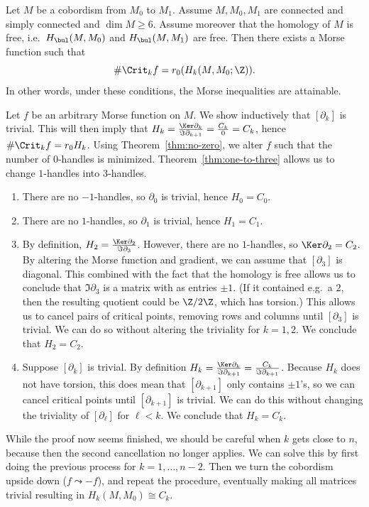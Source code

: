 \begin{theorem}[Smale]
    Let $M$ be a cobordism from $M_0$ to $M_1$.
    Assume $M, M_0, M_1$ are connected and simply connected and $\dim M \ge 6$.
    Assume moreover that the homology of $M$ is free, i.e.\ $H_{\bul}(M, M_0)$ and $H_{\bul}(M, M_1)$ are free.
    Then there exists a Morse function such that
    \[
        \# \Crit_k f = r_0(H_k(M, M_0; \Z))
    .\] 
    In other words, under these conditions, the Morse inequalities are attainable.
    \label{thm:minimal-cob}
\end{theorem}
\begin{myproof}
    Let $f$ be an arbitrary Morse function on $M$.
    We show inductively that $[\partial_k]$ is trivial.
    This will then imply that $H_k = \frac{\Ker \partial_k}{\Im \partial_{k+1}} = \frac{C_k}{0} = C_k$, hence $\# \Crit_kf = r_0 H_k$.
    Using Theorem~\ref{thm:no-zero}, we alter $f$ such that the number of $0$-handles is minimized. Theorem~\ref{thm:one-to-three} allows us to change $1$-handles into $3$-handles.
    \begin{enumerate}
        \item[$H_0$]
            There are no $-1$-handles, so  $\partial_0$ is trivial, hence  $H_0 = C_0$.
        \item[$H_1$]
            There are no $1$-handles, so $\partial_1$ is trivial, hence  $H_1 = C_1$.
        \item[$ H_2$]
            By definition, $H_2 = \frac{\Ker \partial_2}{\Im \partial_3}$.
            However, there are no $1$-handles,
            so $\Ker \partial_2 = C_2$.
            By altering the Morse function and gradient, we can assume that $[\partial_3]$ is diagonal.
            This combined with the fact that the homology is free allows us to conclude that $\Im \partial_3$ is a matrix with as entries $\pm 1$.
            (If it contained e.g.\ a $2$, then the resulting quotient could be  $\Z / 2 \Z$, which has torsion.)
            This allows us to cancel pairs of critical points, removing rows and columns until $[\partial_3]$ is trivial.
            We can do so without altering the triviality for $k = 1,2$.
            We conclude that $H_2 = C_2$.
        \item [$H_k$]
            Suppose $[\partial_k]$ is trivial.
            By definition $H_k = \frac{\Ker \partial_k}{\Im \partial_{k+1}} = \frac{C_k}{\Im \partial_{k+1}}$.
            Because $H_k$ does not have torsion, this does mean that $[\partial_{k+1}]$ only contains $\pm 1$'s, so we can cancel critical points until  $[\partial_{k+1}]$ is trivial. We can do this without changing the triviality of $[\partial_\ell]$ for $\ell < k$.
            We conclude that $H_k = C_k$.
    \end{enumerate}
    While the proof now seems finished, we should be careful when $k$ gets close to  $n$, because then the second cancellation no longer applies.
    We can solve this by first doing the previous process for $k = 1, \ldots, n-2$. 
    Then we turn the cobordism upside down ($f \leadsto -f$), and repeat the procedure, eventually making all matrices trivial resulting in $H_k(M, M_0) \cong C_k$.
\end{myproof}
